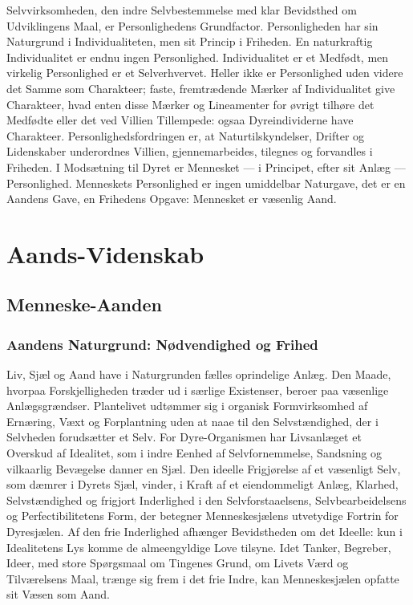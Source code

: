 \documentclass[12pt]{book}
\newcommand{\apage}[1]{\marginnote{\footnotesize\textit{[#1]}}}
\begin{document}
Selvvirksomheden, den indre Selvbestemmelse med klar Bevidsthed om
Udviklingens Maal, er Personlighedens Grundfactor. Personligheden har sin
Naturgrund i Individualiteten, men sit Princip i Friheden. En naturkraftig
Individualitet er endnu ingen Personlighed. Individualitet er et Medfødt,
men virkelig Personlighed er et Selverhvervet. Heller ikke er Personlighed
uden videre det Samme som Charakteer; faste, fremtrædende Mærker af
Individualitet give Charakteer, hvad enten disse Mærker og Lineamenter for
øvrigt tilhøre det Medfødte eller det ved Villien Tillempede: ogsaa
Dyreindividerne have Charakteer. Personlighedsfordringen er, at
Naturtilskyndelser, Drifter og Lidenskaber underordnes Villien,
gjennemarbeides, tilegnes og forvandles i Friheden. I Modsætning til Dyret
er Mennesket --- i Principet, efter sit Anlæg --- Personlighed. Menneskets
Personlighed er ingen umiddelbar Naturgave, det er en Aandens Gave, en
Frihedens Opgave: Mennesket er væsenlig Aand.


 \apage{216} 
\part{Aands-Videnskab}

\chapter{Menneske-Aanden}

\section{Aandens Naturgrund: Nødvendighed og Frihed}
\label{sec:21}

\noindent Liv, Sjæl og Aand have i Naturgrunden fælles oprindelige Anlæg.
Den Maade, hvorpaa Forskjelligheden træder ud i særlige Existenser, beroer
paa væsenlige Anlægsgrændser. Plantelivet udtømmer sig i organisk
Formvirksomhed af Ernæring, Væxt og Forplantning uden at naae til den
Selvstændighed, der i Selvheden forudsætter et Selv. For Dyre-Organismen
har Livsanlæget et Overskud af Idealitet, som i indre Eenhed af
Selvfornemmelse, Sandsning og vilkaarlig Bevægelse danner en Sjæl. Den
ideelle Frigjørelse af et væsenligt Selv, som dæmrer i Dyrets Sjæl, vinder,
i Kraft af et eiendommeligt Anlæg, Klarhed, Selvstændighed og frigjort
Inderlighed i den \apage{217} Selvforstaaelsens, Selvbearbeidelsens og Perfectibilitetens
Form, der betegner Menneskesjælens utvetydige Fortrin for Dyresjælen. Af
den frie Inderlighed afhænger Bevidstheden om det Ideelle: kun i
Idealitetens Lys komme de almeengyldige Love tilsyne. Idet Tanker,
Begreber, Ideer, med store Spørgsmaal om Tingenes Grund, om Livets Værd og
Tilværelsens Maal, trænge sig frem i det frie Indre, kan Menneskesjælen
opfatte sit Væsen som Aand.
\end{document}
